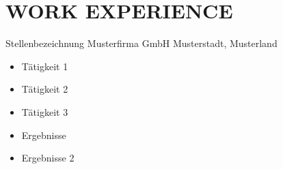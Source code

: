 \section{WORK EXPERIENCE}

        {Stellenbezeichnung}
        {Musterfirma GmbH}
        {Musterstadt, Musterland}
        {}   %
        {
        \begin{itemize}
            \item Tätigkeit 1
            \item Tätigkeit 2
            \item Tätigkeit 3
            \item Ergebnisse
            \item Ergebnisse 2
        \end{itemize}
        }


